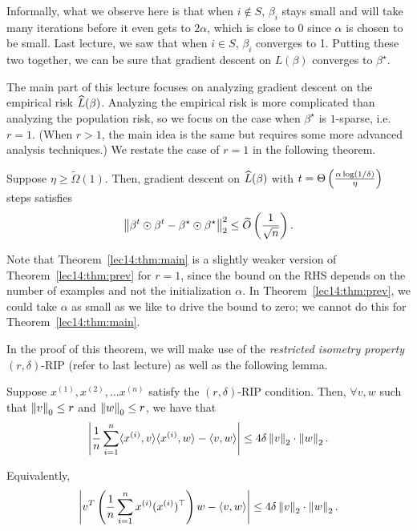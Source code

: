 Informally, what we observe here is that when $i \notin S$, $\beta_{i}$ stays small and will take many iterations before it even gets to $2\alpha$, which is close to $0$ since $\alpha$ is chosen to be small. Last lecture, we saw that when $i\in S$, $\beta_i$ converges to 1. Putting these two together, we can be sure that gradient descent on $L(\beta)$ converges to $\beta^\star.$


The main part of this lecture focuses on analyzing gradient descent on the empirical risk $\widehat{L}(\beta)$. Analyzing the empirical risk is more complicated than analyzing the population risk, so we focus on the case when $\beta^\star$ is $1$-sparse, i.e. $r=1$. (When $r>1$, the main idea is the same but requires some more advanced analysis techniques.) We restate the case of $r=1$ in the following theorem.
 
\begin{theorem} \label{lec14:thm:main}
Suppose $\eta \geq \widetilde{\Omega}(1).$ Then, gradient descent on $\widehat{L}(\beta)$ with $t = \Theta \left(\frac{\alpha \log (1/\delta)}{\eta}\right)$ steps satisfies 
\begin{equation}
\left\|\beta^{t} \odot \beta^{t} - \beta^\star \odot \beta^\star\right\|_{2}^{2} \leq \widetilde{O}\left(\frac{1}{\sqrt{n}}\right).
\end{equation} 
\end{theorem}

\begin{remark}
Note that Theorem~\ref{lec14:thm:main} is a slightly weaker version of Theorem~\ref{lec14:thm:prev} for $r=1$, since the bound on the RHS depends on the number of examples and not the initialization $\alpha$. In Theorem~\ref{lec14:thm:prev}, we could take $\alpha$ as small as we like to drive the bound to zero; we cannot do this for Theorem~\ref{lec14:thm:main}.
\end{remark}

In the proof of this theorem, we will make use of the \textit{restricted isometry property} $(r, \delta)$-RIP (refer to last lecture) as well as the following lemma.

\begin{lemma}\label{lec14:lem:rip}
    Suppose $x^{(1)}, x^{(2)}, \dots x^{(n)}$ satisfy the $(r, \delta)$-RIP condition. Then, $\forall v, w$ such that $\left\|v\right\|_{0} \leq r$ and $\left\|w\right\|_{0} \leq r$, we have that
    \begin{equation}
        \left| \frac{1}{n} \sum_{i=1}^{n} \langle x^{(i)}, v \rangle \langle x^{(i)}, w \rangle  - \langle v, w \rangle \right| \leq 4 \delta \left\|v\right\|_{2} \cdot \left\|w\right\|_{2}.
    \end{equation} 
    
    Equivalently,
    \begin{equation}
        \left|  v^{T} \left(\frac{1}{n} \sum_{i=1}^{n}  x^{(i)} (x^{(i)})^\top \right)  w  - \langle v, w \rangle \right| \leq 4 \delta \left\|v\right\|_{2} \cdot \left\|w\right\|_{2}.
    \end{equation}
\end{lemma}


